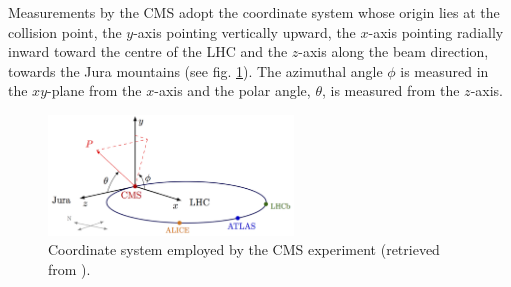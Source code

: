 Measurements by the CMS adopt the coordinate system whose origin lies at the collision point, the $y$-axis pointing vertically upward, the $x$-axis pointing radially inward toward the centre of the LHC and the $z$-axis along the beam direction, towards the Jura mountains (see fig. \ref{fig:coordinate_sys}). The azimuthal angle $\phi$ is measured in the $xy$-plane from the $x$-axis and the polar angle, $\theta$, is measured from the $z$-axis.

\begin{figure}
    \centering
    \includegraphics[width = 0.58\textwidth]{images/cms_coordinate_system.png}
    \caption{Coordinate system employed by the CMS experiment (retrieved from \cite{CMS-wiki}).}
    \label{fig:coordinate_sys}
\end{figure}

